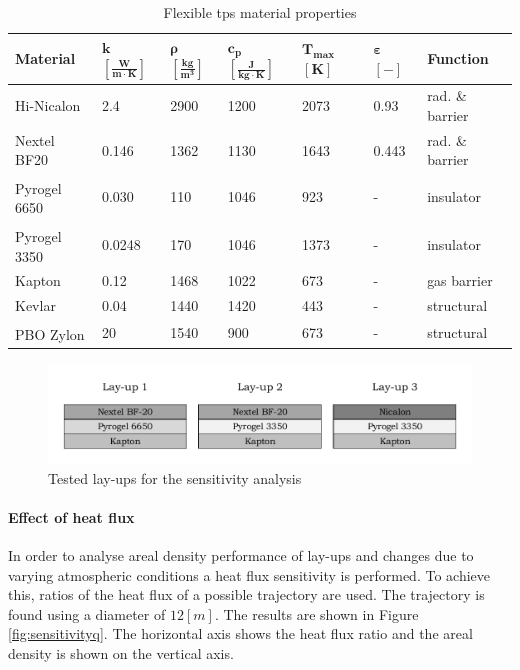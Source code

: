 \begin{table}[ht]
	\caption {Flexible \acrlong{tps} material properties \cite{Corso2009,Corso2011,DuPont2011,Smith2011,Nye,Zinkle1998}}
	\centering
	\begin{tabular}{|l|l|l|l|l|l|l|}
		\hline
	        \textbf{Material}         & \textbf{ $\mathbf{k}$ $\mathbf{\left[\frac{W}{m\cdot K}\right]} $} & \textbf{ $\mathbf{ \rho }$ $\mathbf{ \left[ \frac{kg}{m^3} \right] }$} & \textbf{  $\mathbf{ c_{p} }$ $\mathbf{ \left[ \frac{J}{kg \cdot K} \right] }$ }& \textbf{ $\mathbf{ T_{max} }$ $\mathbf{ [ K ] }$} &\textbf{ $\mathbf{ \varepsilon }$ $\mathbf{ [ - ] }$} & \textbf{Function} \\[1.6ex]   \hline \hline
		Hi-Nicalon			& 2.4			& 2900	& 1200	& 2073	& 0.93	& rad. \& barrier	\\ \hline
		Nextel BF20			& 0.146			& 1362	& 1130	& 1643	& 0.443	& rad. \& barrier	\\ \hline
		Pyrogel\textsuperscript{\textregistered} 6650		& 0.030			& 110	& 1046	& 923	& -		& insulator			\\ \hline
		Pyrogel\textsuperscript{\textregistered} 3350		& 0.0248		& 170	& 1046	& 1373	& -		& insulator			\\ \hline
		Kapton				& 0.12			& 1468	& 1022	& 673	& -		& gas barrier		\\ \hline
		Kevlar				& 0.04			& 1440	& 1420	& 443	& -		& structural		\\ \hline
		PBO Zylon\textsuperscript{\textregistered}			& 20			& 1540	& 900	& 673	& -		& structural		\\ \hline

	\end{tabular}
	\label{tab:tpsmatprop}
\vspace{-4mm}
\end{table}

\begin{figure}[h]
	\centering
	\includegraphics[width=\textwidth]{./Figure/Thermal/layersensthermal.pdf}
	\caption{Tested lay-ups for the sensitivity analysis}
	\label{fig:layersensthermal}
\end{figure}

\paragraph{Effect of heat flux}
In order to analyse areal density performance of lay-ups and changes due to varying atmospheric conditions a heat flux sensitivity is performed. To achieve this, ratios of the heat flux of a possible trajectory are used. The trajectory is found using a diameter of $12 \left[ m \right]$. The results are shown in Figure \ref{fig:sensitivityq}. The horizontal axis shows the heat flux ratio and the areal density is shown on the vertical axis. 


